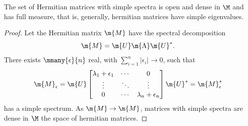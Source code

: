  \begin{proposicao}
 	The set of Hermitian matrices with simple spectra is open and dense in $\M$ and has full measure, that is, generally, hermitian matrices have simple eigenvalues.
 \end{proposicao}
 \begin{proof}
 	Let the Hermitian matrix $\m{M}$ have the spectral decomposition
 	\begin{equation}
 		\m{M} = \m{U} \m{\Lambda} \m{U}^*.
 	\end{equation}
 	There exists $\mmany{\epsilon}{n}$ real, with $\sum_{i=1}^n |\epsilon_i| \rightarrow 0$, such that 
 	\begin{equation}
 		\m{M}_\epsilon = \m{U}
 		\begin{bmatrix}
 			\lambda_1 + \epsilon_1 & \cdots & 0 \\
 			\vdots & \ddots & \vdots \\
 			0 & \cdots & \lambda_n + \epsilon_n \\
 		\end{bmatrix}
 		\m{U}^* = \m{M}^*_\epsilon
 	\end{equation} 
 	has a simple spectrum. As $\m{M} \rightarrow \m{M}$, matrices with simple spectra are dense in $\M$ the space of hermitian matrices.
 \end{proof}
 
 
 
